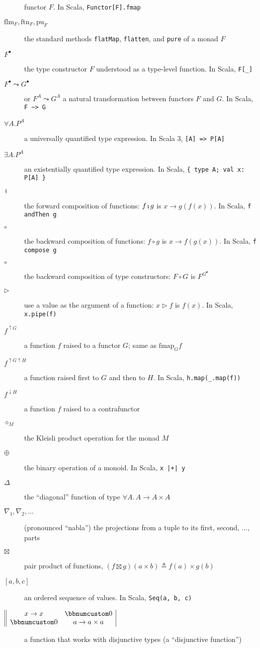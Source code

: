 \begin{description}
functor $F$. In Scala, \lstinline!Functor[F].fmap!
\item [{$\text{flm}_{F},\text{ftn}_{F},\text{pu}_{F}$}] the standard methods
\lstinline!flatMap!, \lstinline!flatten!, and \lstinline!pure!
of a monad $F$
\item [{$F^{\bullet}$}] the type constructor $F$ understood as a type-level
function. In Scala, \lstinline!F[_]! 
\item [{$F^{\bullet}\leadsto G^{\bullet}$}] or $F^{A}\leadsto G^{A}$
a natural transformation between functors $F$ and $G$. In Scala,
\lstinline!F ~> G!
\item [{$\forall A.P^{A}$}] a universally quantified type expression.
In Scala 3, \lstinline![A] => P[A]!
\item [{$\exists A.P^{A}$}] an existentially quantified type expression.
In Scala, \lstinline!{ type A; val x: P[A] }! 
\item [{$\bef$}] the forward composition of functions: $f\bef g$ is $x\rightarrow g(f(x))$.
In Scala, \lstinline!f andThen g!
\item [{$\circ$}] the backward composition of functions: $f\circ g$ is
$x\rightarrow f(g(x))$. In Scala, \lstinline!f compose g!
\item [{$\circ$}] the backward composition of type constructors: $F\circ G$
is $F^{G^{\bullet}}$ 
\item [{$\triangleright$}] use a value as the argument of a function:
$x\triangleright f$ is $f(x)$. In Scala, \lstinline!x.pipe(f)!
\item [{$f^{\uparrow G}$}] a function $f$ raised to a functor $G$; same
as $\text{fmap}_{G}f$
\item [{$f^{\uparrow G\uparrow H}$}] a function raised first to $G$ and
then to $H$. In Scala, \lstinline!h.map(_.map(f))! 
\item [{$f^{\downarrow H}$}] a function $f$ raised to a contrafunctor 
\item [{$\diamond_{M}$}] the Kleisli product operation for the monad $M$
\item [{$\oplus$}] the binary operation of a monoid. In Scala, \lstinline!x |+| y!
\item [{$\Delta$}] the ``diagonal'' function of type $\forall A.\,A\rightarrow A\times A$
\item [{$\nabla_{1},\nabla_{2},...$}] (pronounced ``nabla'') the projections
from a tuple to its first, second, ..., parts
\item [{$\boxtimes$}] pair product of functions, $(f\boxtimes g)(a\times b)\triangleq f(a)\times g(b)$
\item [{$\left[a,b,c\right]$}] an ordered sequence of values. In Scala,
\lstinline!Seq(a, b, c)!
\item [{$\begin{array}{||cc|}
x\rightarrow x & \bbnum 0\\
\bbnum 0 & a\rightarrow a\times a
\end{array}$}] a function that works with disjunctive types (a ``disjunctive
function'')
\end{description}

